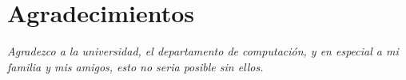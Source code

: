 
\thispagestyle{empty} %

\chapter*{Agradecimientos}

{\sl Agradezco a la universidad, el departamento de computación, y en especial a mi familia y mis amigos, esto no seria posible sin ellos.}

